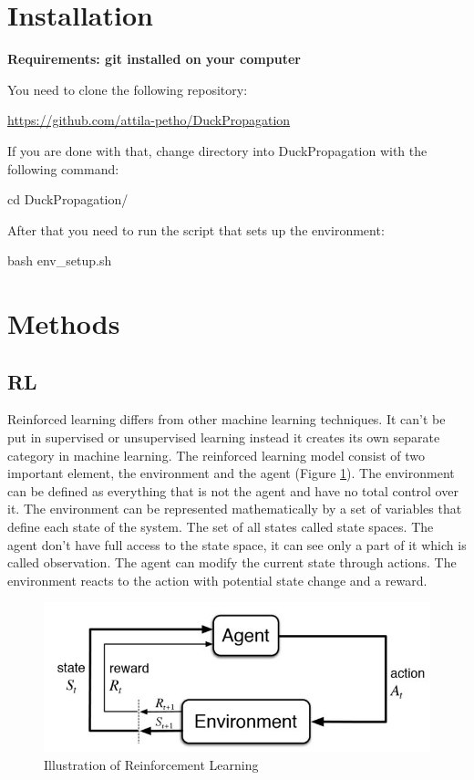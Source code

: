 \documentclass{article}
\begin{document}
\section{\large{Installation}}

\textbf{Requirements: git installed on your computer}

You need to clone the following repository:\\
\begin{center}
  \url{https://github.com/attila-petho/DuckPropagation}
\end{center}

If you are done with that, change directory into DuckPropagation with the following command:
\begin{center}
	cd DuckPropagation/
\end{center}
After that you need to run the script that sets up the environment:
\begin{center}
	bash env\_setup.sh
\end{center}

\section{\large{Methods}}

\subsection{\normalsize{RL}}

Reinforced learning differs from other machine learning techniques. It can't be put in supervised or unsupervised learning instead it creates its own separate category in machine learning. The reinforced learning model consist of two important element, the environment and the agent (Figure \ref{fig:statemachin}). The environment can be defined as everything that is not the agent and have no total control over it. The environment can be represented mathematically by a set of variables that define each state of the system. The set of all states called state spaces. The agent don't have full access to the state space, it can see only a part of it which is called observation. The agent can modify the current state through actions. The environment reacts to the action with potential state change and a reward.


\begin{figure}[h!]
	\centering
	\includegraphics[width=0.8\linewidth]{rl.jpg}
	\caption{Illustration of Reinforcement Learning}
	\label{fig:statemachin}
\end{figure}
\end{document}
